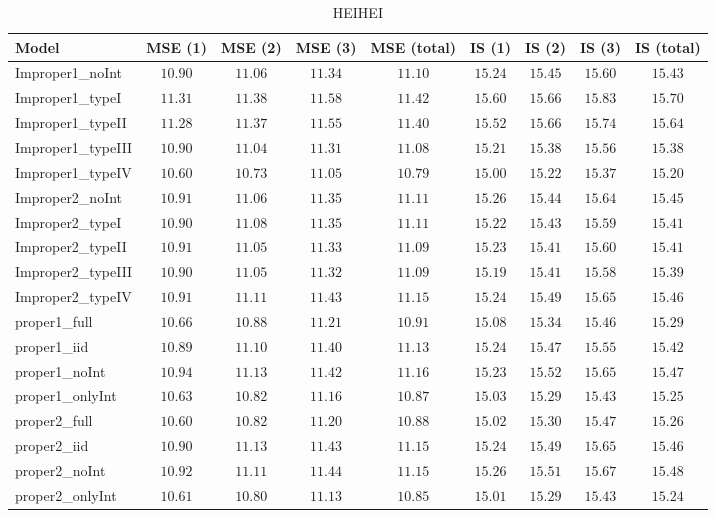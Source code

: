 \begin{table}

\caption{\label{tab:model-choice-sc8}HEIHEI}
\centering
\begin{tabular}{lcccccccc}
\hline
Model  & MSE (1) & MSE (2) & MSE (3) & MSE (total) & IS (1) & IS (2) & IS (3) & \multicolumn{1}{c}{IS (total)} \\ 
\hline
Improper1_noInt  & $10.90$ & $11.06$ & $11.34$ & $11.10$ & $15.24$ & $15.45$ & $15.60$ & $15.43$ \\
Improper1_typeI  & $11.31$ & $11.38$ & $11.58$ & $11.42$ & $15.60$ & $15.66$ & $15.83$ & $15.70$ \\
Improper1_typeII  & $11.28$ & $11.37$ & $11.55$ & $11.40$ & $15.52$ & $15.66$ & $15.74$ & $15.64$ \\
Improper1_typeIII  & $10.90$ & $11.04$ & $11.31$ & $11.08$ & $15.21$ & $15.38$ & $15.56$ & $15.38$ \\
Improper1_typeIV  & $10.60$ & $10.73$ & $11.05$ & $10.79$ & $15.00$ & $15.22$ & $15.37$ & $15.20$ \\
Improper2_noInt  & $10.91$ & $11.06$ & $11.35$ & $11.11$ & $15.26$ & $15.44$ & $15.64$ & $15.45$ \\
Improper2_typeI  & $10.90$ & $11.08$ & $11.35$ & $11.11$ & $15.22$ & $15.43$ & $15.59$ & $15.41$ \\
Improper2_typeII  & $10.91$ & $11.05$ & $11.33$ & $11.09$ & $15.23$ & $15.41$ & $15.60$ & $15.41$ \\
Improper2_typeIII  & $10.90$ & $11.05$ & $11.32$ & $11.09$ & $15.19$ & $15.41$ & $15.58$ & $15.39$ \\
Improper2_typeIV  & $10.91$ & $11.11$ & $11.43$ & $11.15$ & $15.24$ & $15.49$ & $15.65$ & $15.46$ \\
proper1_full  & $10.66$ & $10.88$ & $11.21$ & $10.91$ & $15.08$ & $15.34$ & $15.46$ & $15.29$ \\
proper1_iid  & $10.89$ & $11.10$ & $11.40$ & $11.13$ & $15.24$ & $15.47$ & $15.55$ & $15.42$ \\
proper1_noInt  & $10.94$ & $11.13$ & $11.42$ & $11.16$ & $15.23$ & $15.52$ & $15.65$ & $15.47$ \\
proper1_onlyInt  & $10.63$ & $10.82$ & $11.16$ & $10.87$ & $15.03$ & $15.29$ & $15.43$ & $15.25$ \\
proper2_full  & $10.60$ & $10.82$ & $11.20$ & $10.88$ & $15.02$ & $15.30$ & $15.47$ & $15.26$ \\
proper2_iid  & $10.90$ & $11.13$ & $11.43$ & $11.15$ & $15.24$ & $15.49$ & $15.65$ & $15.46$ \\
proper2_noInt  & $10.92$ & $11.11$ & $11.44$ & $11.15$ & $15.26$ & $15.51$ & $15.67$ & $15.48$ \\
proper2_onlyInt  & $10.61$ & $10.80$ & $11.13$ & $10.85$ & $15.01$ & $15.29$ & $15.43$ & $15.24$ \\
\hline 
\end{tabular}


\end{table}